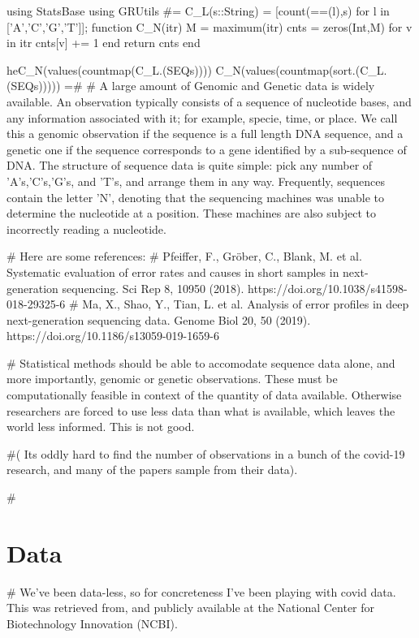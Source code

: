 using StatsBase
using GRUtils
#=
C_L(s::String) = [count(==(l),s) for l in ['A','C','G','T']];
function C_N(itr)
    M = maximum(itr)
    cnts = zeros(Int,M)
   	for v in itr cnts[v] += 1 end
    return cnts
end

heC_N(values(countmap(C_L.(SEQs))))
C_N(values(countmap(sort.(C_L.(SEQs)))))
=#
# A large amount of Genomic and Genetic data is widely available. An observation typically consists of a sequence of nucleotide bases, and any information associated with it; for example, specie, time, or place. We call this a genomic observation if the sequence is a full length DNA sequence, and a genetic one if the sequence corresponds to a gene identified by a sub-sequence of DNA. The structure of sequence data is quite simple: pick any number of 'A's,'C's,'G's, and 'T's, and arrange them in any way. Frequently, sequences contain the letter 'N', denoting that the sequencing machines was unable to determine the nucleotide at a position. These machines are also subject to incorrectly reading a nucleotide.

# Here are some references:
# Pfeiffer, F., Gröber, C., Blank, M. et al. Systematic evaluation of error rates and causes in short samples in next-generation sequencing. Sci Rep 8, 10950 (2018). https://doi.org/10.1038/s41598-018-29325-6
# Ma, X., Shao, Y., Tian, L. et al. Analysis of error profiles in deep next-generation sequencing data. Genome Biol 20, 50 (2019). https://doi.org/10.1186/s13059-019-1659-6

# Statistical methods should be able to accomodate sequence data alone, and more importantly, genomic or genetic observations. These must be computationally feasible in context of the quantity of data available. Otherwise researchers are forced to use less data than what is available, which leaves the world less informed. This is not good.

#( Its oddly hard to find the number of observations in a bunch of the covid-19 research, and many of the papers sample from their data).

# \section{Data}
# We've been data-less, so for concreteness I've been playing with covid data.  This was retrieved from, and publicly available at the National Center for Biotechnology Innovation (NCBI).

